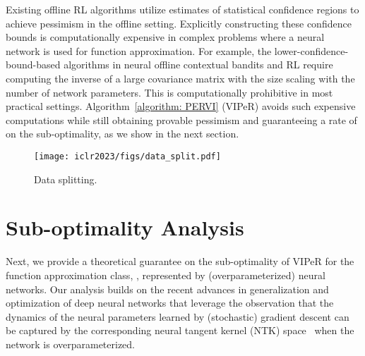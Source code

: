 \documentclass{article} \usepackage{iclr2023/iclr2023_conference,times}
\begin{document}
Existing offline RL algorithms utilize estimates of statistical confidence regions to achieve pessimism in the offline setting. Explicitly constructing these confidence bounds is computationally expensive in complex problems where a neural network is used for function approximation. For example, the lower-confidence-bound-based algorithms in neural offline contextual bandits \citep{nguyen2021offline} and RL \citep{xu2022provably} require computing the inverse of a large covariance matrix with the size scaling with the number of network parameters. This is computationally prohibitive in most practical settings. Algorithm~\ref{algorithm: PERVI} (VIPeR) avoids such expensive computations while still obtaining provable pessimism and guaranteeing a  rate of  on the sub-optimality, as we show in the next section. 









\begin{wrapfigure}{r}{0.24\textwidth}
    \vspace{-45pt}
    \centering
    \texttt{[image: iclr2023/figs/data\_split.pdf]}
    \vspace{-10pt}
    \caption{Data splitting.}
    \label{fig: data split}
    \vspace{-14pt}
\end{wrapfigure}






































%
 \section{Sub-optimality Analysis}
\label{section: subopt analysis}


Next, we provide a theoretical guarantee on the sub-optimality of VIPeR for the function approximation class, , represented by (overparameterized) neural networks. Our analysis builds on the recent advances in generalization and optimization of deep neural networks \citep{arora2019exact, allen2019convergence, hanin2019finite, cao2019generalization, belkin2021fit} that leverage the observation that the dynamics of the neural parameters learned by (stochastic) gradient descent can be captured by the corresponding neural tangent kernel (NTK) space~\citep{jacot2018neural} when the network is overparameterized. 
\end{document}
